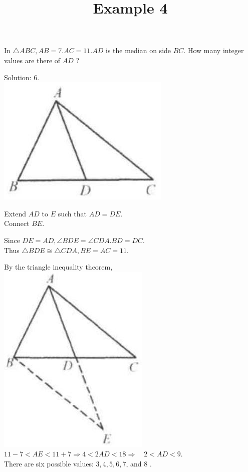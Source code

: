 \documentclass{article}
\title{Example 4}
\date{}
\begin{document}
\maketitle

In \(\triangle A B C, A B=7 . A C=11 . A D\) is the median on side \(B C\). How many integer values are there of \(A D\) ?

Solution: 6.\\
\centering
\includegraphics[width=\textwidth]{images/problem_image_1.jpg}


Extend \(A D\) to \(E\) such that \(A D=D E\).\\
Connect \(B E\).

Since \(D E=A D, \angle B D E=\angle C D A . B D=D C\).\\
Thus \(\triangle B D E \cong \triangle C D A, B E=A C=11\).

By the triangle inequality theorem,\\
\centering
\includegraphics[width=\textwidth]{images/reasoning_image_1.jpg}\\
\(11-7<A E<11+7 \Rightarrow 4<2 A D<18 \Rightarrow \quad 2<A D<9\).\\
There are six possible values: \(3,4,5,6,7\), and 8 .
\end{document}
